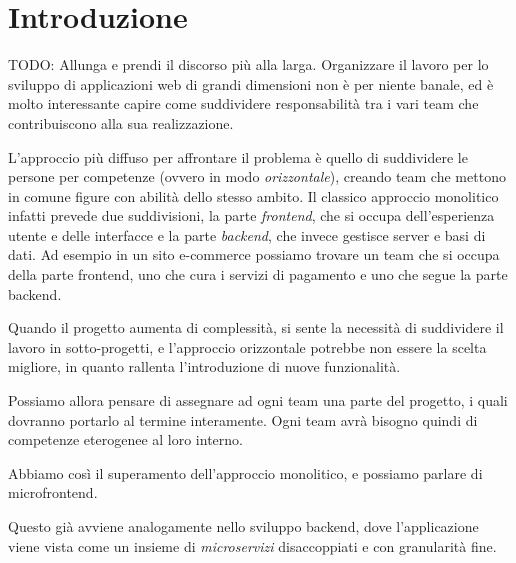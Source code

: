 \chapter{Introduzione}\label{ch:introduzione}
TODO: Allunga e prendi il discorso più alla larga.
Organizzare il lavoro per lo sviluppo di applicazioni web di grandi dimensioni non è per niente banale, ed è molto interessante
capire come suddividere responsabilità tra i vari team che contribuiscono alla sua realizzazione.

L'approccio più diffuso per affrontare il problema è quello di suddividere le persone per competenze (ovvero in modo \emph{orizzontale}), creando team che mettono in comune
figure con abilità dello stesso ambito. Il classico approccio monolitico infatti prevede due suddivisioni, la parte \emph{frontend}, che si occupa dell'esperienza 
utente e delle interfacce e la parte \emph{backend}, che invece gestisce server e basi di dati.
Ad esempio in un sito e-commerce possiamo trovare un team che si occupa della parte frontend, uno che cura 
i servizi di pagamento e uno che segue la parte backend. 

Quando il progetto aumenta di complessità, si sente la necessità 
di suddividere il lavoro in sotto-progetti, e l'approccio orizzontale potrebbe non essere la scelta migliore,
in quanto rallenta l'introduzione di nuove funzionalità.

Possiamo allora pensare di assegnare ad ogni team una parte del progetto, i quali dovranno portarlo al termine
interamente. Ogni team avrà bisogno quindi di competenze eterogenee al loro interno.

Abbiamo così il superamento dell'approccio monolitico, e possiamo parlare di microfrontend.

Questo già avviene analogamente nello sviluppo backend, dove l'applicazione viene vista come un
insieme di \emph{microservizi} disaccoppiati e con granularità fine.
